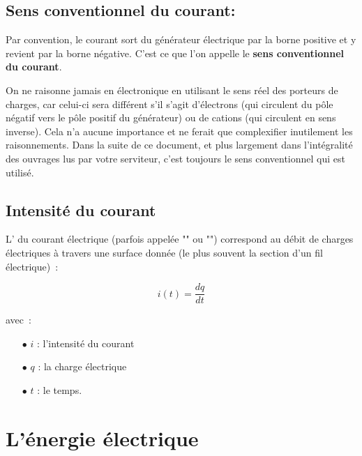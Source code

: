 
\subsection*{ Sens conventionnel du courant: }

Par convention, le courant sort du générateur électrique par la borne positive et y revient par la borne négative. C'est ce que l'on appelle le \textbf{sens conventionnel du courant}. \\

On ne raisonne jamais en électronique en utilisant le sens réel des porteurs de charges, car celui-ci sera différent s'il s'agit d'électrons (qui circulent du pôle négatif vers le pôle positif du générateur) ou de cations (qui circulent en sens inverse). Cela n'a aucune importance et ne ferait que complexifier inutilement les raisonnements. Dans la suite de ce document, et plus largement dans l'intégralité des ouvrages lus par votre serviteur, c'est toujours le sens conventionnel qui est utilisé.

\subsection*{Intensité du courant}

L' du courant électrique (parfois appelée "" ou "") correspond au débit de charges électriques à travers une surface donnée (le plus souvent la section d'un fil électrique)~: 

\begin{equation}
	i(t) = \dfrac{dq}{dt} 
\end{equation}

avec~: \\
\begin{itemize}
	\item[$\bullet$] $i$ : l'intensité du courant
	\item[$\bullet$] $q$ : la charge électrique
	\item[$\bullet$] $t$ : le temps.
\end{itemize}

\section{L'énergie électrique}

